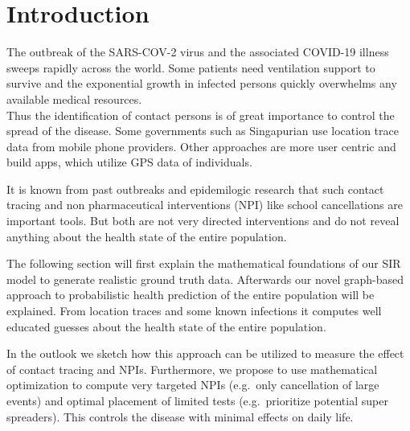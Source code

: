 
\section{Introduction}
The outbreak of the SARS-COV-2 virus and the associated COVID-19 illness sweeps rapidly across the world.
Some patients need ventilation support to survive and the exponential growth in infected persons quickly overwhelms any available medical resources.\\
Thus the identification of contact persons is of great importance to control the spread of the disease.
Some governments such as Singapurian use location trace data from mobile phone providers.
Other approaches are more user centric and build apps, which utilize GPS data of individuals.

It is known from past outbreaks and epidemilogic research that such contact tracing and non pharmaceutical interventions (NPI) like school cancellations are important tools. 
But both are not very directed interventions and do not reveal anything about the health state of the entire population.

The following section will first explain the mathematical foundations of our SIR model to generate realistic ground truth data.
Afterwards our novel graph-based approach to probabilistic health prediction of the entire population will be explained.
From location traces and some known infections it computes well educated guesses about the health state of the entire population.

In the outlook we sketch how this approach can be utilized to measure the effect of contact tracing and NPIs.
Furthermore, we propose to use mathematical optimization to compute very targeted NPIs (e.g.\ only cancellation of large events) and optimal placement of limited tests (e.g.\ prioritize potential super spreaders).
This controls the disease with minimal effects on daily life.